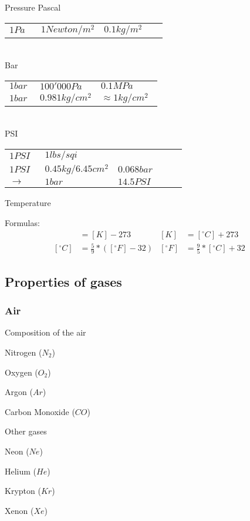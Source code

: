 \documentclass[aspectratio=1610,english,12pt]{beamer}
\begin{document}
\begin{frame}{Pressure}
	Pascal\\
	\begin{tabular}{p{0.2\linewidth} p{0.4\linewidth} l}
		$1 Pa$ & $1 Newton/m^2$ & $0.1kg/m^2$
	\end{tabular}\\
	Bar\\
	\begin{tabular}{p{0.2\linewidth} p{0.4\linewidth} l}
		$1 bar$ & $100'000Pa$ & $0.1MPa$\\
		$1 bar$ & $0.981kg/cm^2$ & $\approx1kg/cm^2$
	\end{tabular}\\
	PSI\\
	\begin{tabular}{p{0.2\linewidth} p{0.4\linewidth} l}
		$1 PSI$ & $1lbs/sqi$&\\
		$1 PSI$ & $0.45kg/6.45cm^2$ & $0.068bar$\\
		$\rightarrow$ & $1bar$ & $14.5PSI$
	\end{tabular}
\end{frame}

\begin{frame}{Temperature}
	 \par
	Formulas:
		\begin{align*}
			[^{\circ}C] &= [K]-273 & [K] &= [^{\circ}C]+273\\
			[^{\circ}C] &= \frac{5}{9}*([^{\circ}F]-32) & [^{\circ}F] &= \frac{9}{5}*[^{\circ}C]+32 &
		\end{align*}
\end{frame}

\subsection{Properties of gases}

\subsubsection{Air}
\begin{frame}{Composition of the air}
	\begin{description}[lalign=parleft]
		\item[$78.084\%$]Nitrogen ($N_2$)
		\item[$20.946\%$]Oxygen ($O_2$)
		\item[$0.934\%$]Argon ($Ar$)
		\item[$0.033\%$]Carbon Monoxide ($CO$)
		\item[$0.003\%$]Other gases
		\item[]
		\item[$18.18ppm$]Neon ($Ne$)
		\item[$5.24ppm$]Helium ($He$)
		\item[$1.14ppm$]Krypton ($Kr$)
		\item[$0.09ppm$]Xenon ($Xe$)
	\end{description}
\end{frame}
\end{document}
